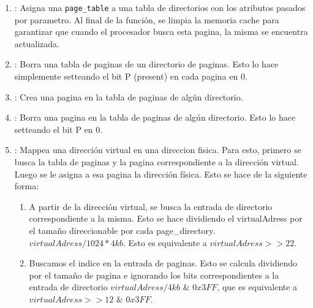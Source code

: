 \begin{enumerate}
\item {}: Asigna una \texttt{page\_table} a una tabla de directorios con los atributos pasados por parametro. Al final de la función, se limpia la memoria cache para garantizar que cuando el procesador busca esta pagina, la misma se encuentra actualizada.

\item {}: Borra una tabla de paginas de un directorio de paginas. Esto lo hace simplemente setteando el bit P (present) en cada pagina en 0.

\item {}: Crea una pagina en la tabla de paginas de algún directorio.

\item {}: Borra una pagina en la tabla de paginas de algún directorio. Esto lo hace setteando el bit P en 0.

\item {}: Mappea una dirección virtual en una direccion fisica. Para esto, primero se busca la tabla de paginas y la pagina correspondiente a la dirección virtual. Luego se le asigna a esa pagina la dirección física. Esto se hace de la siguiente forma:
	\begin{enumerate}
	\item A partir de la dirección virtual, se busca la entrada de directorio correspondiente a la misma. Esto se hace dividiendo el virtualAdress por el tamaño direccionable por cada page\_directory.$virtualAdress / 1024*4kb$. Esto es equivalente a $virtualAdress >> 22$.
	\item Buscamos el indice en la entrada de paginas. Esto se calcula dividiendo por el tamaño de pagina e ignorando los bits correspondientes a la entrada de directorio $virtualAdress / 4kb$ $\&$ $0x3FF$, que es equivalente a $virtualAdress >> 12$ $\&$ $0x3FF$.
	\end{enumerate}


\end{enumerate}

